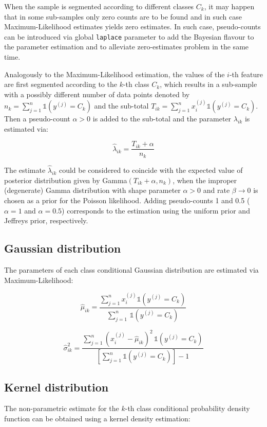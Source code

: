 \documentclass{article}\usepackage[]{graphicx}\usepackage[]{color}
\begin{document}
When the sample is segmented according to different classes $C_k$, it may happen that in some sub-samples only zero counts are to be found and in such case Maximum-Likelihood estimates yields zero estimates. In such case, pseudo-counts can be introduced via global \texttt{laplace} parameter to add the Bayesian flavour to the parameter estimation and to alleviate zero-estimates problem in the same time.


Analogously to the Maximum-Likelihood estimation, the values of the $i$-th feature are first segmented according to the $k$-th class $C_k$, which results in a sub-sample with a possibly different number of data points denoted by $n_k = \sum_{j=1}^n \mathbb{1}(y^{(j)} = C_k)$ and the sub-total $T_{ik} = \sum_{j=1}^n x_i^{(j)}\mathbb{1}(y^{(j)} = C_k)$. Then a pseudo-count $\alpha > 0$ is added to the sub-total and the parameter $\lambda_{ik}$ is estimated via:

$$\hat{\lambda}_{ik} = \frac{T_{ik} + \alpha}{n_k}$$

The estimate $\hat{\lambda}_{ik}$ could be considered to coincide with the expected value of posterior distribution given by Gamma$(T_{ik} + \alpha, n_k)$, when the improper (degenerate) Gamma distribution with shape parameter $\alpha > 0$ and rate $\beta \rightarrow 0$ is chosen as a prior for the Poisson likelihood. Adding pseudo-counts 1 and 0.5 ($\alpha = 1$ and $\alpha = 0.5$) corresponds to the estimation using the uniform prior and Jeffreys prior, respectively.


\subsection{Gaussian distribution}

The parameters of each class conditional Gaussian distribution are estimated via Maximum-Likelihood:

$$\hat{\mu}_{ik} = \frac{\sum_{j=1}^n x_i^{(j)} \mathbb{1}(y^{(j)} = C_k) }{\sum_{j=1}^n \, \mathbb{1}(y^{(j)} = C_k)}$$

$$\hat{\sigma}^2_{ik} = \frac{\sum_{j=1}^n (x_i^{(j)} - \hat{\mu}_{ik})^2 \, \mathbb{1}(y^{(j)} = C_k) }{\left[ \sum_{j=1}^n  \mathbb{1}(y^{(j)} = C_k) \right] - 1}$$


\subsection{Kernel distribution}

The non-parametric estimate for the $k$-th class conditional probability density function can be obtained using a kernel density estimation:
\end{document}
